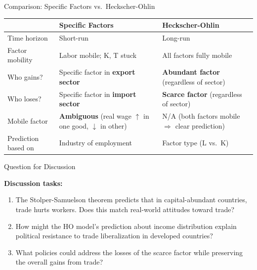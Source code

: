 \documentclass{beamer}
\begin{document}
\begin{frame}{Comparison: Specific Factors vs.\ Heckscher-Ohlin}

\small
\begin{center}
\begin{tabular}{p{2cm}p{3.2cm}p{3.2cm}}
\toprule
& \textbf{Specific Factors} & \textbf{Heckscher-Ohlin} \\
\midrule
Time horizon & Short-run & Long-run \\
\midrule
Factor mobility & Labor mobile; K, T stuck & All factors fully mobile \\
\midrule
Who gains? & Specific factor in \textbf{export sector} & \textbf{Abundant factor} (regardless of sector) \\
\midrule
Who loses? & Specific factor in \textbf{import sector} & \textbf{Scarce factor} (regardless of sector) \\
\midrule
Mobile factor & \textbf{Ambiguous} (real wage $\uparrow$ in one good, $\downarrow$ in other) & N/A (both factors mobile $\Rightarrow$ clear prediction) \\
\midrule
Prediction based on & Industry of employment & Factor type (L vs.\ K) \\
\bottomrule
\end{tabular}
\end{center}

\end{frame}


\begin{frame}{Question for Discussion}

\textbf{Discussion tasks:}

\vspace{0.3cm}

\begin{enumerate}
    \item The Stolper-Samuelson theorem predicts that in capital-abundant countries, trade hurts workers. Does this match real-world attitudes toward trade?
    
    \vspace{0.3cm}
    
    \item How might the HO model's prediction about income distribution explain political resistance to trade liberalization in developed countries?
    
    \vspace{0.3cm}
    
    \item What policies could address the losses of the scarce factor while preserving the overall gains from trade?
\end{enumerate}

\end{frame}
\end{document}
